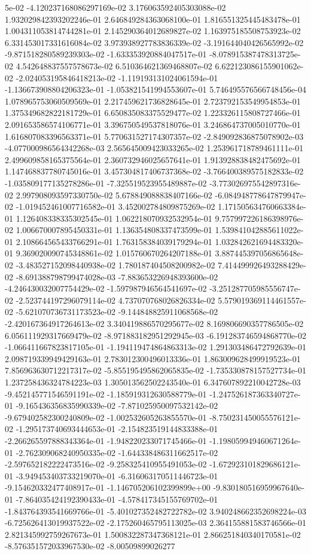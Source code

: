 5e-02	-4.120237168086297169e-02	3.176063592405303088e-02	1.932029842393202246e-01	2.646849284363068100e-01	1.816551325445483478e-01	1.004311053814744281e-01	2.145290364012689827e-02	1.163975185508753923e-02	6.331453017331616084e-02	3.973938927783836339e-02	-3.191644040426565992e-02	-9.871518280589239303e-02	-1.633353920884047517e-01	-8.078915387478313725e-02	4.542648837557578673e-02	6.510364621369468807e-02	6.622123086155901062e-02	-2.024053195846418213e-02	-1.119193131024061594e-01	-1.136673908804206323e-01	-1.053821541994553607e-01	5.746495576566748456e-04	1.078965753060509569e-01	2.217459621736828645e-01	2.723792153549954853e-01	1.375349682822181729e-01	6.650835083375529477e-02	1.223326115808727466e-01	2.091653586574106771e-01	3.396750549537818076e-01	3.246864737005010770e-01	1.616807083396563371e-01	5.770631527174307357e-02	-2.849092836875078902e-03	-4.077000986564342268e-03	2.565645009423033265e-02	1.253961718789461111e-01	2.499609858165375564e-01	2.360732946025657641e-01	1.913928838482475692e-01	1.147468837780745016e-01	3.457304817406737368e-02	-3.766400389575182833e-02	-1.035809177135278286e-01	-7.325519523955489887e-02	-3.773026975542897316e-02	2.997908093597330750e-02	5.678849088838407166e-02	-6.084948778647879947e-02	-1.019452461007716582e-01	3.452002784809875269e-02	1.171505634760663384e-01	1.126408338335302545e-01	1.062218070932532954e-01	9.757997226186398976e-02	1.006670007895450331e-01	1.136354808337473599e-01	1.539841042885611022e-01	2.108664565433766291e-01	1.763158384039179294e-01	1.032842621694483320e-01	9.369020090745348861e-02	1.015760670264207188e-01	3.887445397056865648e-02	-3.483527152098440938e-02	1.780187404508200982e-02	7.414499926493288429e-02	-8.691388798799474028e-03	-7.883653226948393600e-02	-4.246430032007754429e-02	-1.597987946564541697e-02	-3.251287705985556747e-02	-2.523744197296079114e-02	4.737070768026826334e-02	5.579019369114461557e-02	-5.621070736731173523e-02	-9.144848825911068568e-02	-2.420167364917264613e-02	3.340419886570295677e-02	8.169806690357786505e-02	6.056111929317669479e-02	-8.971883182951292945e-03	-6.191283746594868770e-02	-1.066411667823817105e-01	-1.194119474864863313e-02	1.291303486472792639e-01	2.098719339949429163e-01	2.783012300496013336e-01	1.863009628499919523e-01	7.856963630712217317e-02	-5.855195495862065835e-02	-1.735330878157527734e-01	1.237258436324784223e-03	1.305013562502243540e-01	6.347607892210042728e-03	-9.452145771546591191e-02	-1.185919312630588779e-01	-1.247526187363340727e-01	-9.165436356835990339e-02	-7.871025950097532142e-02	-9.679402582300240809e-02	-1.002532605263855570e-01	-8.750231450055576121e-02	-1.295173740693444653e-01	-2.154823519144833388e-01	-2.266265597888343364e-01	-1.948220233071745466e-01	-1.198059949460671264e-01	-2.762309068240950335e-02	-1.644338486311662517e-02	-2.597652182222473516e-02	-9.258325410955491053e-02	-1.672923101829686121e-01	-3.949453403733219070e-01	-6.316063170511446723e-01	-9.154620332477408917e-01	-1.146705206102399899e+00	-9.830180516959967640e-01	-7.864035424192390433e-01	-4.578417345155769702e-01	-1.843764393541669766e-01	-5.401027352482722782e-02	3.940248662352698224e-03	-6.725626413019937522e-02	-2.175260465795113025e-03	2.364155881583746566e-01	2.821345992759267673e-01	1.500832287347368121e-01	2.866251840340170581e-02	-8.576351572033967530e-02	-8.00509899026277